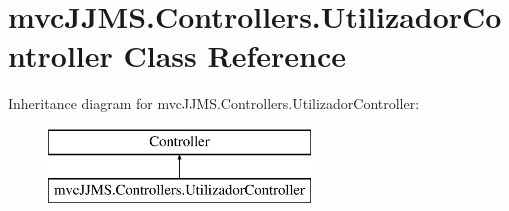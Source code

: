 \hypertarget{classmvc_j_j_m_s_1_1_controllers_1_1_utilizador_controller}{}\section{mvc\+J\+J\+M\+S.\+Controllers.\+Utilizador\+Controller Class Reference}
\label{classmvc_j_j_m_s_1_1_controllers_1_1_utilizador_controller}
Inheritance diagram for mvc\+J\+J\+M\+S.\+Controllers.\+Utilizador\+Controller\+:\begin{figure}[H]
\begin{center}
\leavevmode
\includegraphics[height=2.000000cm]{classmvc_j_j_m_s_1_1_controllers_1_1_utilizador_controller}
\end{center}
\end{figure}

